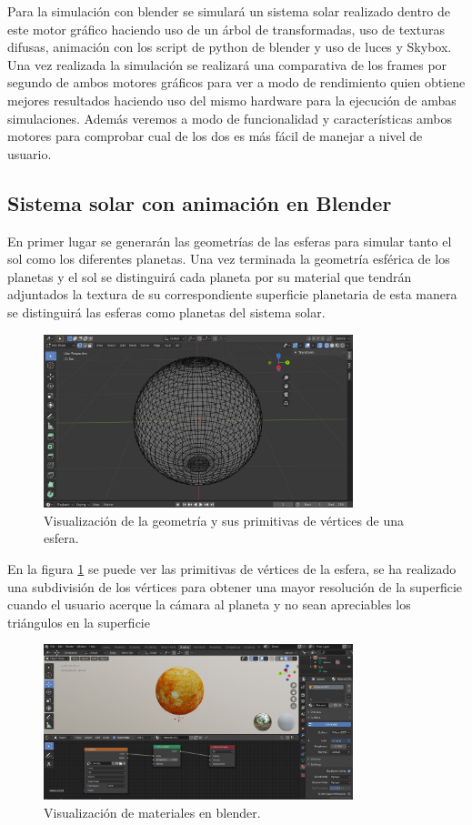 \documentclass[a4paper]{book}
\begin{document}
Para la simulación con blender se simulará un sistema solar realizado dentro de este motor gráfico haciendo uso de un árbol de transformadas,
uso de texturas difusas, animación con los script de python de blender y uso de luces y Skybox. Una vez realizada la  simulación se realizará
una comparativa de los frames por segundo de ambos motores gráficos para ver a modo de rendimiento quien obtiene mejores resultados haciendo
uso del mismo hardware para la ejecución de ambas simulaciones. Además veremos a modo de funcionalidad y características ambos motores para
comprobar cual de los dos es más fácil de manejar a nivel de usuario.

\subsection{Sistema solar con animación en Blender}
\label{subsec:BlenderComp}

En primer lugar se generarán las geometrías de las esferas para simular tanto el sol como los diferentes planetas. Una vez terminada
la geometría esférica de los planetas y el sol se distinguirá cada planeta por su material que tendrán adjuntados la textura de su
correspondiente superficie planetaria de esta manera se distinguirá las esferas como planetas del sistema solar.

\begin{figure}[H]
    \centering
    \includegraphics[width=9cm, keepaspectratio]{img/Geometry.png}
    \caption{Visualización de la geometría y sus primitivas de vértices de una esfera.}
    \label{Geometry}
\end{figure}

En la figura \ref{Geometry} se puede ver las primitivas de vértices de la esfera, se ha realizado una subdivisión de los vértices para obtener una mayor
resolución de la superficie cuando el usuario acerque la cámara al planeta y no sean apreciables los triángulos en la superficie

\begin{figure}[H]
    \centering
    \includegraphics[width=9cm, keepaspectratio]{img/MaterialBlender.png}
    \caption{Visualización de materiales en blender.}
    \label{materialesBlender}
\end{figure}
\end{document}
